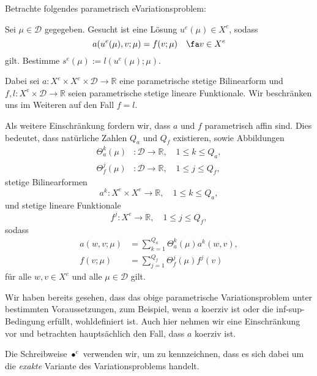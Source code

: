 Betrachte folgendes parametrisch eVariationsproblem:
\begin{addmargin}[2em]{2em}
    Sei $\mu \in \mathcal D$ gegegeben. Gesucht ist eine Lösung $u^e(\mu) \in X^e$, sodass
    \begin{equation}
        a(u^e(\mu), v; \mu) = f(v; \mu) \quad \fa v \in X^e
    \end{equation}
    gilt.
    Bestimme $s^e(\mu) := l(u^e(\mu); \mu)$.
\end{addmargin}
Dabei sei $a \colon X^e \times X^e \times \mathcal D \to \mathbb{R}$ eine parametrische stetige Bilinearform und $f, l \colon X^e \times \mathcal D \to \mathbb{R}$ seien parametrische stetige lineare Funktionale.
Wir beschränken uns im Weiteren auf den Fall $f = l$.

Als weitere Einschränkung fordern wir, dass $a$ und $f$ parametrisch affin sind.
Dies bedeutet, dass natürliche Zahlen $Q_a$ und $Q_f$ existieren, sowie Abbildungen
\begin{align}
    \Theta_a^k(\mu) &\colon \mathcal D \to \mathbb{R}, \quad 1 \leq k \leq Q_a, \\
    \Theta_f^j(\mu) &\colon \mathcal D \to \mathbb{R}, \quad 1 \leq j \leq Q_f,
\end{align}
stetige Bilinearformen
\begin{equation}
    a^k \colon X^e \times X^e \to \mathbb{R}, \quad 1 \leq k \leq Q_a,
\end{equation}
und stetige lineare Funktionale
\begin{equation}
    f^j \colon X^e \to \mathbb{R}, \quad 1 \leq j \leq Q_f,
\end{equation}
sodass
\begin{align*}
    a(w, v; \mu) &= \sum_{k=1}^{Q_a} \Theta_a^k(\mu) a^k(w, v), \\
    f(v; \mu)    &= \sum_{j=1}^{Q_f} \Theta_f^j(\mu) f^j(v)
\end{align*}
für alle $w, v \in X^e$ und alle $\mu \in \mathcal D$ gilt.


Wir haben bereits gesehen, dass das obige parametrische Variationsproblem unter bestimmten Voraussetzungen, zum Beispiel, wenn $a$ koerziv ist oder die inf-sup-Bedingung erfüllt, wohldefiniert ist.
Auch hier nehmen wir eine Einschränkung vor und betrachten hauptsächlich den Fall, dass $a$ koerziv ist.

Die Schreibweise $\bullet^e$ verwenden wir, um zu kennzeichnen, dass es sich dabei um die \emph{exakte} Variante des Variationsproblems handelt.

